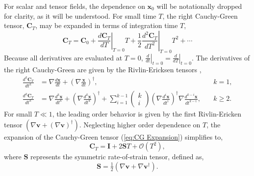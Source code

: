 \documentclass[twocolumn]{svjour3}
\begin{document}
For scalar and tensor fields, the dependence on $\mathbf{x}_0$ will be notationally dropped for clarity, as it will be understood. For small time \(T\), the right Cauchy-Green tensor, \(\mathbf{C}_T  \), may be expanded in terms of integration time $T$,
\begin{equation}
\mathbf{C}_T   = \mathbf{C}_0+\left.\frac{d\mathbf{C}_T}{dT}\right|_{T=0}T + \frac{1}{2} \left.\frac{d^2\mathbf{C}_T}{dT^2}\right|_{T=0}T^2+ \cdots
\label{eq:CG Expansion}	
\end{equation}
Because all derivatives are evaluated at $T=0$, $\left.\tfrac{d}{dt}\right|_{t=0}=\left.\tfrac{d}{dT}\right|_{t=0}$. The derivatives of the right Cauchy-Green are given by the Rivlin-Ericksen tensors \cite{truesdell2004non},
\begin{equation}
\begin{aligned}
\frac{d^k\mathbf{C}_T}{dt^k} &= \nabla\frac{d\mathbf{x}}{dt}+\left(\nabla\frac{\mathbf{x}}{dt}\right)^\dagger, &k=1,\\
\frac{d^k\mathbf{C}_T}{dt^k} &= \nabla\frac{d^k\mathbf{x}}{dt^k} + \left(\nabla\frac{d^k\mathbf{x}}{dt^k}\right)^\dagger+ \sum_{i=1}^{k-1}\left(\!\begin{array}{c}
k \\ i
\end{array}\!\right)\left(\nabla\frac{d^i\mathbf{x}}{dt^i}\right)^\dagger \nabla\frac{d^{k-i}\mathbf{x}}{dt^{k-i}}, \quad &k \geq 2.
\end{aligned}
\end{equation}
For small $T\ll1$, the leading order behavior is given by the first Rivlin-Ericken tensor $(\nabla\mathbf{v}+(\nabla\mathbf{v})^\dagger)$. Neglecting higher order dependence on $T$, the expansion of the Cauchy-Green tensor (\ref{eq:CG Expansion}) simplifies to,
\begin{equation}
\mathbf{C}_T   = \mathbf{I} + 2 \mathbf{S} T
+ \mathcal{O}(T^2),
\label{eq:Expansion2}
\end{equation}
where $\mathbf{S}$ represents the symmetric rate-of-strain tensor, defined as,
\begin{equation}
\mathbf{S}   = \tfrac{1}{2} \left( \nabla \mathbf{v}  + \nabla \mathbf{v} ^\dagger \right).
\end{equation}
\end{document}
